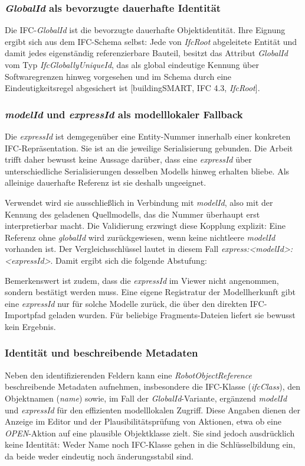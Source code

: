 \subsubsection{\textit{GlobalId} als bevorzugte dauerhafte Identität}
Die IFC-\textit{GlobalId} ist die bevorzugte dauerhafte Objektidentität. Ihre Eignung ergibt sich
aus dem IFC-Schema selbst: Jede von \textit{IfcRoot} abgeleitete Entität und damit jedes
eigenständig referenzierbare Bauteil, besitzt das Attribut \textit{GlobalId} vom Typ
\textit{IfcGloballyUniqueId}, das als global eindeutige Kennung über Softwaregrenzen hinweg
vorgesehen und im Schema durch eine Eindeutigkeitsregel abgesichert ist [buildingSMART, IFC 4.3,
\textit{IfcRoot}].

\subsubsection{\textit{modelId} und \textit{expressId} als modelllokaler Fallback}
Die \textit{expressId} ist demgegenüber eine Entity-Nummer innerhalb einer konkreten
IFC-Repräsentation. Sie ist an die jeweilige Serialisierung gebunden. Die Arbeit trifft daher
bewusst keine Aussage darüber, dass eine \textit{expressId} über unterschiedliche Serialisierungen
desselben Modells hinweg erhalten bliebe. Als alleinige dauerhafte Referenz ist sie deshalb
ungeeignet.

Verwendet wird sie ausschließlich in Verbindung mit \textit{modelId}, also mit der Kennung des
geladenen Quellmodells, das die Nummer überhaupt erst interpretierbar macht. Die Validierung
erzwingt diese Kopplung explizit: Eine Referenz ohne \textit{globalId} wird zurückgewiesen, wenn
keine nichtleere \textit{modelId} vorhanden ist. Der Vergleichsschlüssel lautet in diesem Fall
\textit{express:<modelId>:<expressId>}. Damit ergibt sich die folgende Abstufung:

Bemerkenswert ist zudem, dass die \textit{expressId} im Viewer nicht angenommen, sondern bestätigt
werden muss. Eine eigene Registratur der Modellherkunft gibt eine \textit{expressId} nur für solche
Modelle zurück, die über den direkten IFC-Importpfad geladen wurden. Für beliebige Fragments-Dateien
liefert sie bewusst kein Ergebnis.

\subsubsection{Identität und beschreibende Metadaten}
Neben den identifizierenden Feldern kann eine \textit{RobotObjectReference} beschreibende Metadaten
aufnehmen, insbesondere die IFC-Klasse (\textit{ifcClass}), den Objektnamen (\textit{name}) sowie, 
im Fall der \textit{GlobalId}-Variante, ergänzend \textit{modelId} und \textit{expressId} für den
effizienten modelllokalen Zugriff. Diese Angaben dienen der Anzeige im Editor und der
Plausibilitätsprüfung von Aktionen, etwa ob eine \textit{OPEN}-Aktion auf eine plausible
Objektklasse zielt. Sie sind jedoch ausdrücklich keine Identität: Weder Name noch IFC-Klasse gehen
in die Schlüsselbildung ein, da beide weder eindeutig noch änderungsstabil sind.


